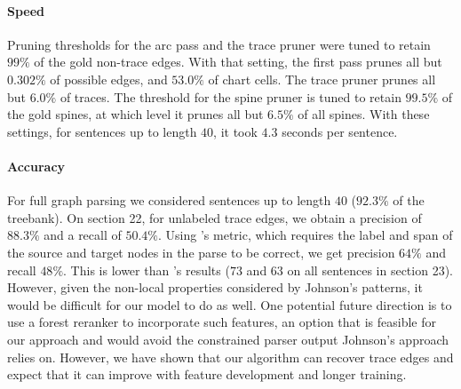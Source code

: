 \paragraph{Speed}
Pruning thresholds for the arc pass and the trace pruner were tuned to retain $99\%$ of the gold non-trace edges.
With that setting, the first pass prunes all but $0.302\%$ of possible edges, and $53.0\%$ of chart cells.
The trace pruner prunes all but $6.0\%$ of traces.
The threshold for the spine pruner is tuned to retain $99.5\%$ of the gold spines, at which level it prunes all but $6.5\%$ of all spines.
With these settings, for sentences up to length $40$, it took $4.3$ seconds per sentence.

\paragraph{Accuracy}
For full graph parsing we considered sentences up to length $40$ ($92.3\%$ of the treebank).
On section 22, for unlabeled trace edges, we obtain a precision of $88.3\%$ and a recall of $50.4\%$.
Using \textcite{Johnson:2002}'s metric, which requires the label and span of the source and target nodes in the parse to be correct, we get precision $64\%$ and recall $48\%$.
This is lower than \textcite{Johnson:2002}'s results ($73$ and $63$ on all sentences in section 23).
However, given the non-local properties considered by Johnson's patterns, it would be difficult for our model to do as well.
One potential future direction is to use a forest reranker to incorporate such features, an option that is feasible for our approach and would avoid the constrained parser output Johnson's approach relies on.
However, we have shown that our algorithm can recover trace edges and expect that it can improve with feature development and longer training.

